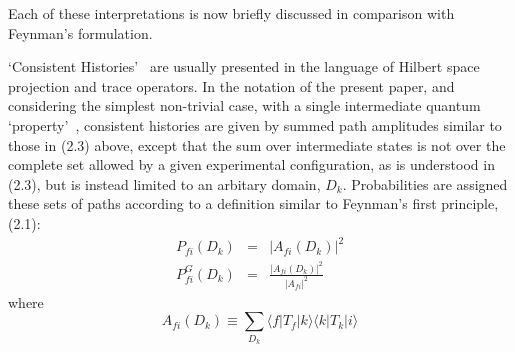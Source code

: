 {     Each of these interpretations is now briefly discussed in comparison with Feynman's
     formulation.
    \par `Consistent Histories'~\cite{Griffiths,Omnes,GMH} are usually presented in the language
   of Hilbert space projection and trace operators. In the notation of the present paper, and 
   considering the simplest non-trivial case, with a single intermediate quantum `property'~\cite{Omnes},
   consistent histories are given by summed path amplitudes similar to those in
    (2.3) above, except that the sum over intermediate states is not over the complete set
    allowed by a given experimental configuration, as is understood in (2.3), but is instead
   limited to an arbitary domain, $D_k$. Probabilities are assigned these sets of paths 
   according to a definition similar to Feynman's first principle, (2.1):
   \begin{eqnarray}
    P_{fi}(D_k) & = & |A_{fi}(D_k)|^2 \\
     P_{fi}^G (D_k) & = & \frac{|A_{fi}(D_k)|^2}{|A_{fi}|^2} 
  \end{eqnarray}
   where 
 \begin{equation}
 A_{fi}(D_k) \equiv \sum_{D_k} \langle f|T_f|k\rangle \langle k |T_k|i\rangle 
  \end{equation}

}
